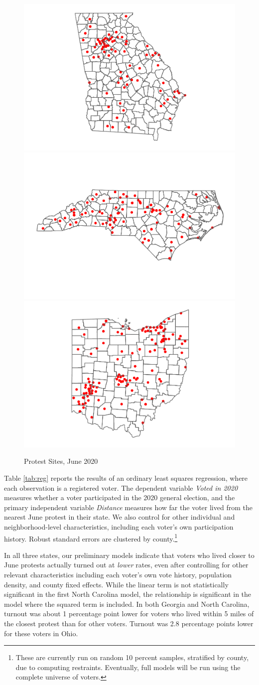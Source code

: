 \documentclass[
  12pt,
]{article}
\begin{document}
\begin{figure}[H]
\includegraphics[width=0.32\linewidth]{asa_abstract_files/figure-latex/figures-side-1} \includegraphics[width=0.32\linewidth]{asa_abstract_files/figure-latex/figures-side-2} \includegraphics[width=0.32\linewidth]{asa_abstract_files/figure-latex/figures-side-3} \caption{\label{fig:map}Protest Sites, June 2020}\label{fig:figures-side}
\end{figure}

Table \ref{tab:reg} reports the results of an ordinary least squares regression, where each observation is a registered voter. The dependent variable \emph{Voted in 2020} measures whether a voter participated in the 2020 general election, and the primary independent variable \emph{Distance} measures how far the voter lived from the nearest June protest in their state. We also control for other individual and neighborhood-level characteristics, including each voter's own participation history. Robust standard errors are clustered by county.\footnote{These are currently run on random 10 percent samples, stratified by county, due to computing restraints. Eventually, full models will be run using the complete universe of voters.}

\begin{singlespace}

\end{singlespace}

In all three states, our preliminary models indicate that voters who lived closer to June protests actually turned out at \emph{lower} rates, even after controlling for other relevant characteristics including each voter's own vote history, population density, and county fixed effects. While the linear term is not statistically significant in the first North Carolina model, the relationship is significant in the model where the squared term is included. In both Georgia and North Carolina, turnout was about 1 percentage point lower for voters who lived within 5 miles of the closest protest than for other voters. Turnout was 2.8 percentage points lower for these voters in Ohio.
\end{document}
